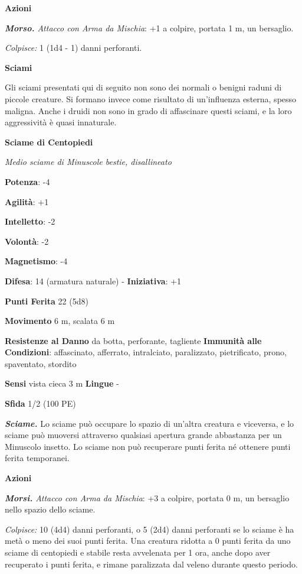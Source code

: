 \begin{multicols}{2}
\smallskip\textbf{Azioni}

\emph{\textbf{Morso.} Attacco con Arma da Mischia}: +1 a colpire,
portata 1 m, un bersaglio.

\emph{Colpisce:} 1 (1d4 - 1) danni perforanti.

\textbf{Sciami}

Gli sciami presentati qui di seguito non sono dei normali o benigni
raduni di piccole creature. Si formano invece come risultato di
un'influenza esterna, spesso maligna. Anche i druidi non sono in grado
di affascinare questi sciami, e la loro aggressività è quasi innaturale.

\textbf{Sciame di Centopiedi}

\emph{Medio sciame di Minuscole bestie, disallineato}

\textbf{Potenza}: -4

\textbf{Agilità}: +1

\textbf{Intelletto}: -2

\textbf{Volontà}: -2

\textbf{Magnetismo}: -4

\textbf{Difesa}: 14 (armatura naturale) - \textbf{Iniziativa}: +1

\textbf{Punti Ferita} 22 (5d8)

\textbf{Movimento} 6 m, scalata 6 m

\textbf{Resistenze al Danno} da botta, perforante, tagliente
\textbf{Immunità alle Condizioni}: affascinato, afferrato, intralciato,
paralizzato, pietrificato, prono, spaventato, stordito

\textbf{Sensi} vista cieca 3 m \textbf{Lingue} -

\textbf{Sfida} 1/2 (100 PE)\smallskip

\emph{\textbf{Sciame.}} Lo sciame può occupare lo spazio di un'altra
creatura e viceversa, e lo sciame può muoversi attraverso qualsiasi
apertura grande abbastanza per un Minuscolo insetto. Lo sciame non può
recuperare punti ferita né ottenere punti ferita temporanei.

\smallskip\textbf{Azioni}

\emph{\textbf{Morsi.} Attacco con Arma da Mischia}: +3 a colpire,
portata 0 m, un bersaglio nello spazio dello sciame.

\emph{Colpisce:} 10 (4d4) danni perforanti, o 5 (2d4) danni perforanti
se lo sciame è ha metà o meno dei suoi punti ferita. Una creatura
ridotta a 0 punti ferita da uno sciame di centopiedi e stabile resta
avvelenata per 1 ora, anche dopo aver recuperato i punti ferita, e
rimane paralizzata dal veleno durante questo periodo.


\end{multicols}
